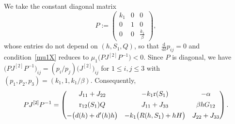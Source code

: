 \documentclass[reqno,11pt]{amsart}
\numberwithin{equation}{section}
\newcommand{\rd}{\mathrm{d}}
\begin{document}
We take the constant diagonal matrix
\begin{equation*}
P:=\begin{pmatrix} k_1 & 0 & 0\\[2pt] 0 & 1 & 0\\[2pt] 0 & 0 & \frac{k_1}{\beta} \end{pmatrix},
\end{equation*}
whose entries do not depend on $(h,S_1,Q)$, so that $\tfrac{\rd}{\rd t}p_{ij}=0$ and condition~\eqref{mu1X} reduces to 
$\mu_1\big(PJ^{[2]}P^{-1}\big)<0$. Since $P$ is diagonal, we have $\big(PJ^{[2]}P^{-1}\big)_{ij}=(p_i/p_j)\big(J^{[2]}\big)_{ij}$ for
$1\le i,j\le3$ with  $(p_1,p_2,p_3)=(k_1,1,k_1/\beta)$. Consequently,
\[
PJ^{[2]}P^{-1}=\begin{pmatrix}
J_{11}+J_{22} & -k_1{\rm r}(S_1) & -\alpha\\[4pt]
{\rm r}_{12}(S_1)Q & J_{11}+J_{33} & \beta hG_{12}\\[4pt]
-\big(d(h)+d'(h)h\big) & -k_1\big(R(h,S_1)+hH\big) & J_{22}+J_{33}
\end{pmatrix}.
\]
\end{document}
